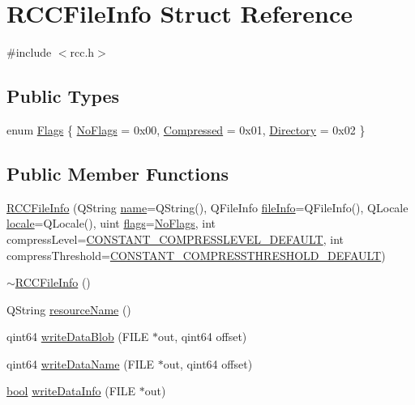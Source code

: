 \hypertarget{structRCCFileInfo}{}\section{R\+C\+C\+File\+Info Struct Reference}
\label{structRCCFileInfo}


{\ttfamily \#include $<$rcc.\+h$>$}

\subsection*{Public Types}
\begin{DoxyCompactItemize}
\item 
enum \hyperlink{structRCCFileInfo_a1d5fa2cb967921bbc17daec292388e8e}{Flags} \{ \hyperlink{structRCCFileInfo_a1d5fa2cb967921bbc17daec292388e8ea4dfe61bfcfeb2ee1ee4ef0d8b637f3b8}{No\+Flags} = 0x00, 
\hyperlink{structRCCFileInfo_a1d5fa2cb967921bbc17daec292388e8eac39cb95a16b156328639a44e8fcf8b81}{Compressed} = 0x01, 
\hyperlink{structRCCFileInfo_a1d5fa2cb967921bbc17daec292388e8eab9e1e25b170d9f0a9e2f5f77db037cd0}{Directory} = 0x02
 \}
\end{DoxyCompactItemize}
\subsection*{Public Member Functions}
\begin{DoxyCompactItemize}
\item 
\hyperlink{structRCCFileInfo_ac51b397f39ed564d2ea6d02e7b5670be}{R\+C\+C\+File\+Info} (Q\+String \hyperlink{structRCCFileInfo_a3c1a9f04c22607ee67b95f5c98085f2a}{name}=Q\+String(), Q\+File\+Info \hyperlink{structRCCFileInfo_afc207131879f29502959baba420e7bb2}{file\+Info}=Q\+File\+Info(), Q\+Locale \hyperlink{structRCCFileInfo_a1e7756985c38cf9af35e74a0b56abbfb}{locale}=Q\+Locale(), uint \hyperlink{structRCCFileInfo_a8a6bdf23979de163aa9e9636467d7248}{flags}=\hyperlink{structRCCFileInfo_a1d5fa2cb967921bbc17daec292388e8ea4dfe61bfcfeb2ee1ee4ef0d8b637f3b8}{No\+Flags}, int compress\+Level=\hyperlink{rcc_8h_a04e0c6776fe1d6fb9343634a83006523}{C\+O\+N\+S\+T\+A\+N\+T\+\_\+\+C\+O\+M\+P\+R\+E\+S\+S\+L\+E\+V\+E\+L\+\_\+\+D\+E\+F\+A\+U\+L\+T}, int compress\+Threshold=\hyperlink{rcc_8h_a913016695556be5ada922ab2b09290b2}{C\+O\+N\+S\+T\+A\+N\+T\+\_\+\+C\+O\+M\+P\+R\+E\+S\+S\+T\+H\+R\+E\+S\+H\+O\+L\+D\+\_\+\+D\+E\+F\+A\+U\+L\+T})
\item 
\hyperlink{structRCCFileInfo_ab325e6e3f9ddba94ff508e3c208a9025}{$\sim$\+R\+C\+C\+File\+Info} ()
\item 
Q\+String \hyperlink{structRCCFileInfo_a1ac6ae1afb555ded2ee280e5aab97093}{resource\+Name} ()
\item 
qint64 \hyperlink{structRCCFileInfo_a4862e579c8d10835865e44ec20d91fd1}{write\+Data\+Blob} (F\+I\+L\+E $\ast$out, qint64 offset)
\item 
qint64 \hyperlink{structRCCFileInfo_aae2d7c08f3b08d52cdd12ce6a847322f}{write\+Data\+Name} (F\+I\+L\+E $\ast$out, qint64 offset)
\item 
\hyperlink{compiler_8h_abb452686968e48b67397da5f97445f5b}{bool} \hyperlink{structRCCFileInfo_ad5178b82b4b85215372160253044bd4d}{write\+Data\+Info} (F\+I\+L\+E $\ast$out)
\end{DoxyCompactItemize}
